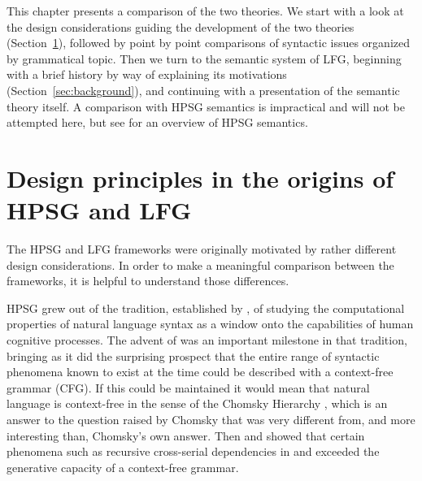This chapter presents a comparison of the two theories.
 We start with a look at the design considerations guiding the development of the two theories (Section~\ref{design-sec}), followed by point by point comparisons of syntactic issues organized by grammatical topic.  Then we turn to the semantic system of LFG, beginning with a brief history by way of explaining its motivations (Section~\ref{sec:background}), and continuing with a presentation of the semantic theory itself.  A comparison with HPSG semantics is impractical and will not be attempted here, but see   for an overview of HPSG semantics.  

\section{Design principles in the origins of HPSG and LFG} 
\label{design-sec}
The HPSG and LFG  frameworks were originally motivated by rather different design considerations.  In order to make a meaningful comparison between the frameworks, it is helpful to understand those differences.  

HPSG grew out of the tradition, established by \citet{Chomsky57a}, of studying the computational properties of natural language syntax as a window onto the capabilities of human cognitive processes.  The advent of  \citep{GKPS85a} was an important milestone in that tradition, bringing as it did the surprising prospect that the entire range of syntactic phenomena known to exist at the time could be described with a context-free grammar (CFG).  If this could be maintained it would mean that natural language is context-free in the sense of the Chomsky Hierarchy \citep{Chomsky57a}, which is an answer to the question raised by Chomsky that was very different from, and more interesting than, Chomsky's own answer.  Then  \citet{Shieber85a} and \citet{Culy85a} showed that certain phenomena such as recursive cross-serial dependencies in  and  exceeded the generative capacity of a context-free grammar.   


